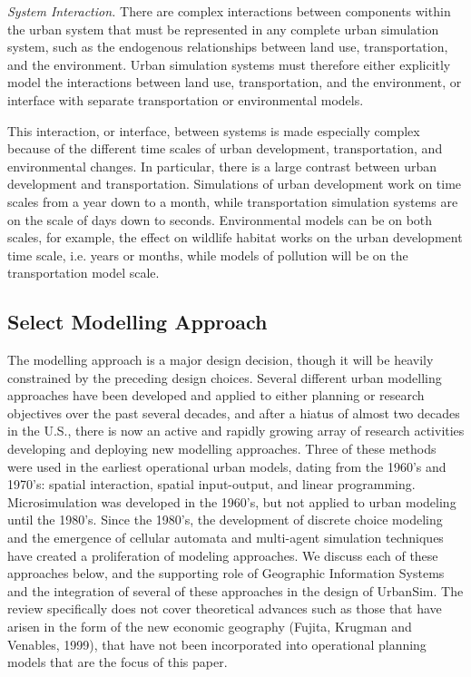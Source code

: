 \emph{System Interaction.}  There are complex interactions between components within the urban system that must be represented in any complete urban simulation system, such as the endogenous relationships between land use, transportation, and the environment. Urban simulation systems must therefore either explicitly model the interactions between land use, transportation, and the environment, or interface with separate transportation or environmental models.

This interaction, or interface, between systems is made especially complex because of the different time scales of urban development, transportation, and environmental changes. In particular, there is a large contrast between urban development and transportation. Simulations of urban development work on time scales from a year down to a month, while transportation simulation systems are on the scale of days down to seconds. Environmental models can be on both scales, for example, the effect on wildlife habitat works on the urban development time scale, i.e. years or months, while models of pollution will be on the transportation model scale.

\subsection{Select Modelling Approach}

The modelling approach is a major design decision, though it will be heavily constrained by the preceding design choices.  Several different urban modelling approaches have been developed and applied to either planning or research objectives over the past several decades, and after a hiatus of almost two decades in the U.S., there is now an active and rapidly growing array of research activities developing and deploying new modelling approaches.  Three of these methods were used in the earliest operational urban models, dating from the 1960's and 1970's: spatial interaction, spatial input-output, and linear programming.  Microsimulation was developed in the 1960's, but not applied to urban modeling until the 1980's.  Since the 1980's, the development of discrete choice modeling and the emergence of cellular automata and multi-agent simulation techniques have created a proliferation of modeling approaches.  We discuss each of these approaches below, and the supporting role of Geographic Information Systems and the integration of several of these approaches in the design of UrbanSim.  The review specifically does not cover theoretical advances such as those that have arisen in the form of the new economic geography (Fujita, Krugman and Venables, 1999), that have not been incorporated into operational planning models that are the focus of this paper.

